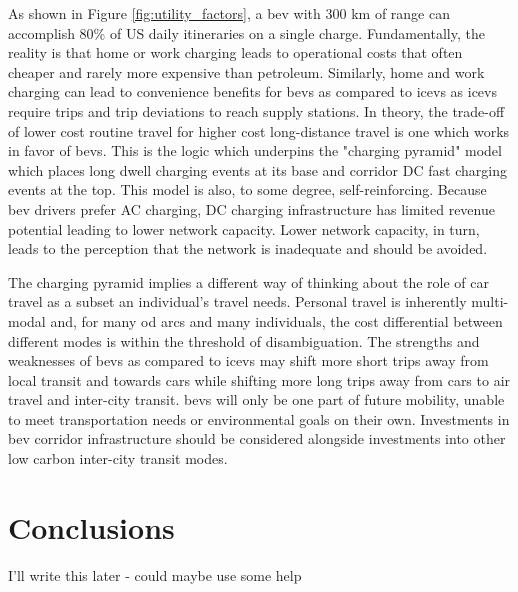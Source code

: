 \documentclass[11pt]{article}
\begin{document}
\begin{multicols}{2}
As shown in Figure \ref{fig:utility_factors}, a \gls{bev} with 300 km of range can accomplish 80\% of US daily itineraries on a single charge. Fundamentally, the reality is that home or work charging leads to operational costs that often cheaper and rarely more expensive than petroleum. Similarly, home and work charging can lead to convenience benefits for \glspl{bev} as compared to \glspl{icev} \cite{Rabinowitz_2023} as \glspl{icev} require trips and trip deviations to reach supply stations. In theory, the trade-off of lower cost routine travel for higher cost long-distance travel is one which works in favor of \glspl{bev}. This is the logic which underpins the "charging pyramid" model which places long dwell charging events at its base and corridor DC fast charging events at the top. This model is also, to some degree, self-reinforcing. Because \gls{bev} drivers prefer AC charging, DC charging infrastructure has limited revenue potential leading to lower network capacity. Lower network capacity, in turn, leads to the perception that the network is inadequate and should be avoided.

The charging pyramid implies a different way of thinking about the role of car travel as a subset an individual's travel needs. Personal travel is inherently multi-modal and, for many \gls{od} arcs and many individuals, the cost differential between different modes is within the threshold of disambiguation. The strengths and weaknesses of \glspl{bev} as compared to \glspl{icev} may shift more short trips away from local transit and towards cars while shifting more long trips away from cars to air travel and inter-city transit. \glspl{bev} will only be one part of future mobility, unable to meet transportation needs or environmental goals on their own. Investments in \gls{bev} corridor infrastructure should be considered alongside investments into other low carbon inter-city transit modes.

\section*{Conclusions}

I'll write this later - could maybe use some help

 

\newpage

\printbibliography

\appendix


\end{multicols}
\end{document}
